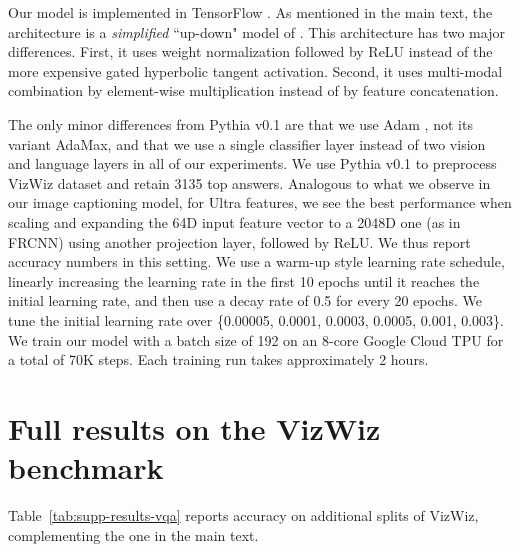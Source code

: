 \documentclass[11pt,a4paper]{article}
\begin{document}
Our model is implemented in TensorFlow \cite{tensorflow2015-whitepaper}.
As mentioned in the main text, the architecture is a \emph{simplified} ``up-down" model of \cite{anderson18bottomup}.
This architecture has two major differences.
First, it uses weight normalization \cite{salimans16weightnorm} followed by ReLU instead of the more expensive gated hyperbolic tangent activation.
Second, it uses multi-modal combination by element-wise multiplication instead of by feature concatenation.

The only minor differences from Pythia v0.1 are that we use Adam \cite{adam}, not its variant AdaMax,
and that we use a single classifier layer instead of two vision and language layers in all of our experiments.
We use Pythia v0.1 \cite{jiang18pythia} to preprocess VizWiz dataset and retain 3135 top answers.
Analogous to what we observe in our image captioning model, for Ultra features, we see the best performance when scaling and expanding the 64D input feature vector to a 2048D one (as in FRCNN) using another projection layer, followed by ReLU.
We thus report accuracy numbers in this setting.
We use a warm-up style learning rate schedule, linearly increasing the learning rate in the first 10 epochs until it reaches the initial learning rate, and then use a decay rate of 0.5 for every 20 epochs.
We tune the initial learning rate over \{0.00005, 0.0001, 0.0003, 0.0005, 0.001, 0.003\}.
We train our model with a batch size of 192 on an 8-core Google Cloud TPU for a total of 70K steps.
Each training run takes approximately 2 hours.

\section{Full results on the VizWiz benchmark}

Table~\ref{tab:supp-results-vqa} reports accuracy on additional splits of VizWiz, complementing the one in the main text.

 
\end{document}
